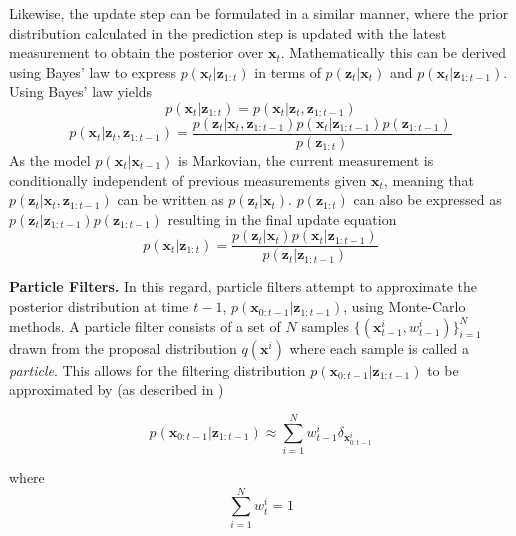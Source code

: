 \documentclass[letterpaper, 10 pt, conference]{ieeeconf}
\renewcommand{\vec}[1]{\boldsymbol{#1}}
\begin{document}
Likewise, the update step can be formulated in a similar manner, where the prior distribution calculated in the prediction step is updated with the latest measurement to obtain the posterior over $\vec{x}_t$. Mathematically this can be derived using Bayes' law to express $p(\vec{x}_t|\vec{z}_{1:t})$ in terms of $p(\vec{z}_t|\vec{x}_t)$ and $p(\vec{x}_t|\vec{z}_{1:t-1})$. Using Bayes' law yields
\begin{equation*}
	p(\vec{x}_t|\vec{z}_{1:t}) = p(\vec{x}_t|\vec{z}_t,\vec{z}_{1:t-1})
\end{equation*}
\begin{equation*}
p(\vec{x}_t|\vec{z}_t,\vec{z}_{1:t-1}) = \frac{p(\vec{z}_t|\vec{x}_t, \vec{z}_{1:t-1})p(\vec{x}_t|\vec{z}_{1:t-1})p(\vec{z}_{1:t-1})}{p(\vec{z}_{1:t})}
\end{equation*}
As the model $p(\vec{x}_t|\vec{x}_{t-1})$ is Markovian, the current measurement is conditionally independent of previous measurements given $\vec{x}_t$, meaning that $p(\vec{z}_{t}|\vec{x}_t, \vec{z}_{1:t-1})$ can be written as $p(\vec{z}_t|\vec{x}_t)$. $p(\vec{z}_{1:t})$ can also be expressed as $p(\vec{z}_t|\vec{z}_{1:t-1})p(\vec{z}_{1:t-1})$ resulting in the final update equation \cite{ParticleNotes}
\begin{equation} \label{eq:update}
	p(\vec{x}_t|\vec{z}_{1:t}) = \frac{p(\vec{z}_{t}|\vec{x}_t)p(\vec{x}_{t}|\vec{z}_{1:t-1})}{p(\vec{z}_t|\vec{z}_{1:t-1})}
\end{equation}





\textbf{Particle Filters.} In this regard, particle filters attempt to approximate the posterior distribution at time $t-1$, $p(\vec{x}_{0:t-1}|\vec{z}_{1:t-1})$, using Monte-Carlo methods. A particle filter consists of a set of $N$ samples $\{ (\vec{x}^i_{t-1}, w^i_{t-1}) \}_{i=1}^N$ drawn from the proposal distribution $q(\vec{x}^i)$ where each sample is called a \emph{particle}. This allows for the filtering distribution $p(\vec{x}_{0:t-1}|\vec{z}_{1:t-1})$ to be approximated by (as described in \cite{ParticleNotes})

\begin{equation}
 	p(\vec{x}_{0:t-1}|\vec{z}_{1:t-1}) \approx \sum_{i=1}^{N}{w^i_{t-1}\delta_{\vec{x}^i_{0:t-1}}}
\end{equation}

 where
\begin{equation}
	\sum_{i=1}^{N}{w^i_t} = 1
\end{equation}
\end{document}
